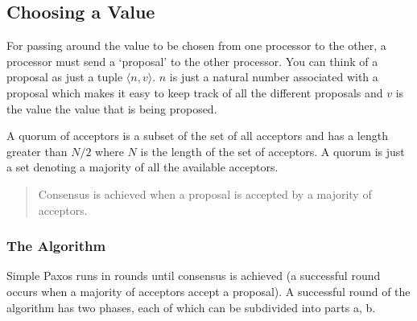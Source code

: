 \vspace{-4mm}
\subsection{Choosing a Value}
For passing around the value to be chosen from one processor to the other,
a processor must send a `proposal' to the other processor.
You can think of a proposal as just a tuple $\langle n, v \rangle$.
$n$ is just a natural number associated with a proposal which makes
it easy to keep track of all the different proposals and $v$ is the value
the value that is being proposed.

A \textsf{quorum} of acceptors is a subset of the set of all acceptors
and has a length greater
than $N / 2$ where $N$ is the length of the set of acceptors. A \textsf{quorum} is just
a set denoting a majority of all the available acceptors.

\begin{quote}
Consensus is achieved when a proposal is accepted by a majority of acceptors.
\end{quote}

\vspace{-4mm}
\subsubsection{The Algorithm}
Simple Paxos runs in rounds until consensus is achieved (a successful round
occurs when a majority of acceptors accept a proposal).
A successful round of the algorithm has two phases, each of which can
be subdivided into parts a, b.

